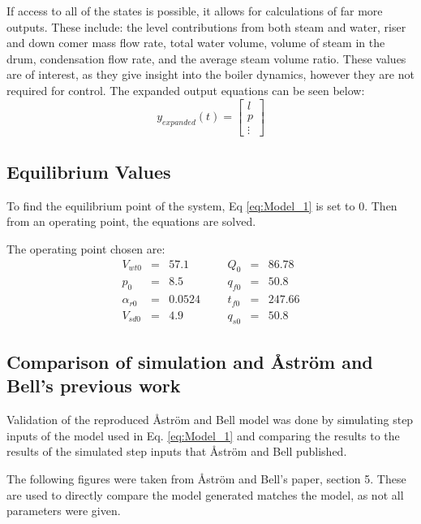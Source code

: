     If access to all of the states is possible, it allows for calculations of far more outputs. These include: the level contributions from both steam and water, riser and down comer mass flow rate, total water volume, volume of steam in the drum, condensation flow rate, and the average steam volume ratio. These values are of interest, as they give insight into the boiler dynamics, however they are not required for control. The expanded output equations can be seen below:
    $$y_{expanded}(t) = \left [ \begin{matrix} l\\ p \\ \vdots \end{matrix} \right ] $$
    
    \subsection{Equilibrium Values}
    
        To find the equilibrium point of the system, Eq \ref{eq:Model_1} is set to 0. Then from an operating point, the equations are solved.
        
        The operating point chosen are:
        $$ \begin{matrix} V_{wt0}     & = &   57.1 & & & Q_{0}  & = & 86.78\\ 
                          p_0         & = &    8.5 & & & q_{f0} & = & 50.8\\ 
                          \alpha_{r0} & = & 0.0524 & & & t_{f0} & = & 247.66\\ 
                          V_{sd0}     & = &    4.9 & & & q_{s0} & = & 50.8
                          \end{matrix} $$
                  
    \subsection{Comparison of simulation and \r{A}str\"{o}m and Bell's previous work}

        Validation of the reproduced \r{A}str\"{o}m and Bell model was done by simulating step inputs of the model used in Eq. \eqref{eq:Model_1} and comparing the results to the results of the simulated step inputs that \r{A}str\"{o}m and Bell published. 
        
        The following figures were taken from \r{A}str\"{o}m and Bell's paper, section 5. These are used to directly compare the model generated matches the model, as not all parameters were given. 
        
